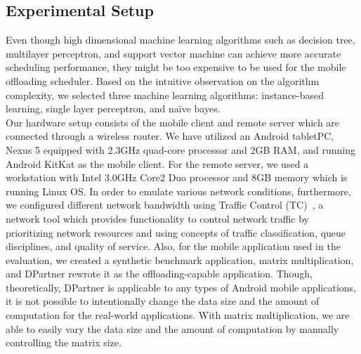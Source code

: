 \documentclass[10pt, conference, compsocconf]{IEEEtran}
\begin{document}
{\subsection{Experimental Setup}
%
Even though high dimensional machine learning algorithms such as
decision tree, multilayer perceptron, and support vector machine can
achieve more accurate scheduling performance, they might be too
expensive to be used for the mobile offloading scheduler.
%
Based on the intuitive observation on the algorithm complexity, we
selected three machine learning algorithms: instance-based learning,
single layer perceptron, and na\"{i}ve bayes.\\ 
%
\indent Our hardware setup consists of the mobile client and
remote server which are connected through a wireless router.
%
We have utilized an Android tabletPC, Nexus 5 equipped with 2.3GHz
quad-core processor and 2GB RAM, and running Android KitKat as the
mobile client.
%
For the remote server, we used a workstation with Intel 3.0GHz Core2 Duo
processor and 8GB memory which is running Linux OS.
%
In order to emulate various network conditions, furthermore, we
configured different network bandwidth using Traffic Control
(TC)~\cite{tc}, a network tool which provides functionality to control
network traffic by prioritizing network resources and using concepts of
traffic classification, queue disciplines, and quality of service.
%
Also, for the mobile application used in the evaluation, we created
a synthetic benchmark application, matrix multiplication, and DPartner
rewrote it as the offloading-capable application.
%
Though, theoretically, DPartner is applicable to any types of Android
mobile applications, it is not possible to intentionally change the data
size and the amount of computation for the real-world applications.
%
With matrix multiplication, we are able to easily vary the data size and
the amount of computation by manually controlling the matrix size.
%
}
\end{document}
